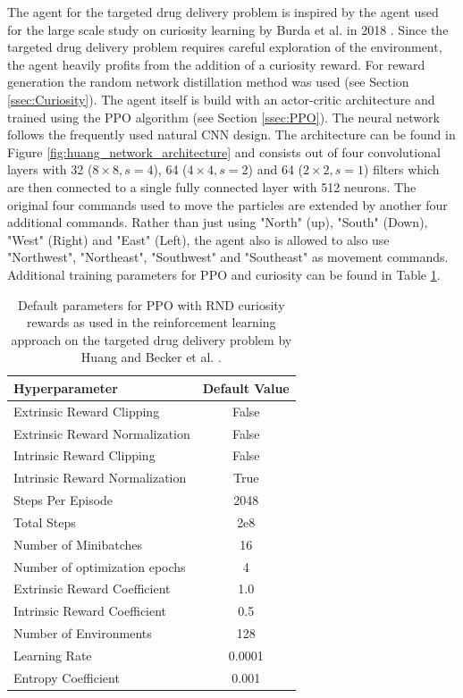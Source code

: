The agent for the targeted drug delivery problem is inspired by the agent used for the large scale study on curiosity learning by Burda et al. in 2018 \cite{burda2018large}. Since the targeted drug delivery problem requires careful exploration of the environment, the agent heavily profits from the addition of a curiosity reward. For reward generation the random network distillation method was used (see Section \ref{ssec:Curiosity}). The agent itself is build with an actor-critic architecture and trained using the PPO algorithm (see Section \ref{ssec:PPO}). The neural network follows the frequently used natural CNN design. The architecture can be found in Figure \ref{fig:huang_network_architecture} and consists out of four convolutional layers with 32 ($8\times 8, s=4$), 64 ($4\times 4, s=2$) and 64 ($2\times 2, s=1$) filters which are then connected to a single fully connected layer with 512 neurons. The original four commands used to move the particles are extended by another four additional commands. Rather than just using "North" (up), "South" (Down), "West" (Right) and "East" (Left), the agent also is allowed to also use "Northwest", "Northeast", "Southwest" and "Southeast" as movement commands. Additional training parameters for PPO and curiosity can be found in Table \ref{tab:RLDefaults}.

\begin{table} [ht]
    \begin{center}
        \begin{tabular}{|p{6.5cm}|c|}
            \hline
            Hyperparameter & Default Value \\
            \hline
            Extrinsic Reward Clipping & False \\
            Extrinsic Reward Normalization & False \\
            Intrinsic Reward Clipping & False \\
            Intrinsic Reward Normalization & True \\
            Steps Per Episode & 2048 \\
            Total Steps & 2e8 \\
            Number of Minibatches & 16 \\
            Number of optimization epochs & 4 \\
            Extrinsic Reward Coefficient & 1.0 \\
            Intrinsic Reward Coefficient & 0.5 \\
            Number of Environments & 128 \\
            Learning Rate & 0.0001 \\
            Entropy Coefficient & 0.001 \\
            \hline
        \end{tabular}
    \end{center}
    \caption[RL Approach Default Parameters]{Default parameters for PPO with RND curiosity rewards as used in the reinforcement learning approach on the targeted drug delivery problem by Huang and Becker et al. \cite{huang2019}.} \label{tab:RLDefaults}
\end{table}


